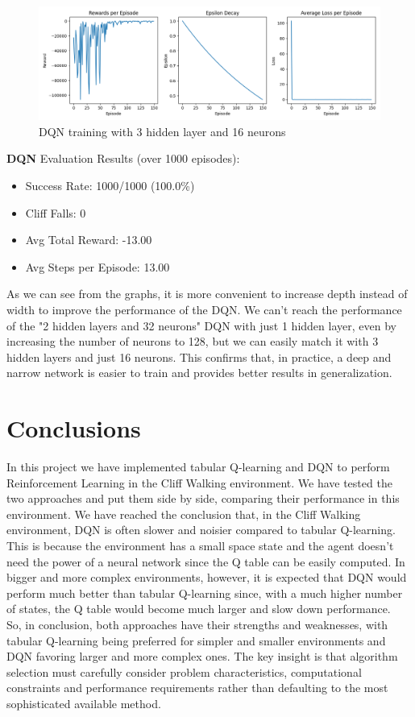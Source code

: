 \documentclass[a4paper,12pt]{article}
\begin{document}
\begin{figure}[H]
    \centering
    \includegraphics[width=\linewidth]{3_16.png}
    \caption{DQN training with 3 hidden layer and 16 neurons}
\end{figure}
\textbf{DQN} Evaluation Results (over 1000 episodes):
\begin{itemize}
    \item Success Rate: 1000/1000 (100.0\%)
    \item Cliff Falls: 0
    \item Avg Total Reward: -13.00
    \item Avg Steps per Episode: 13.00
\end{itemize}
\vspace{0,5cm}
As we can see from the graphs, it is more convenient to increase depth instead of width to improve the performance of the DQN. We can't reach the performance of the "2 hidden layers and 32 neurons" DQN with just 1 hidden layer, even by increasing the number of neurons to 128, but we can easily match it with 3 hidden layers and just 16 neurons. This confirms that, in practice, a deep and narrow network is easier to train and provides
better results in generalization.

\section{Conclusions}
In this project we have implemented tabular Q-learning and DQN to perform Reinforcement Learning in the Cliff Walking environment. We have tested the two approaches and put them side by side, comparing their performance in this environment. We have reached the conclusion that, in the Cliff Walking environment, DQN is often slower and noisier compared to tabular Q-learning. This is because the environment has a small space state and the agent doesn't need the power of a neural network since the Q table can be easily computed. In bigger and more complex environments, however, it is expected that DQN would perform much better than tabular Q-learning since, with a much higher number of states, the Q table would become much larger and slow down performance.\\

\noindent So, in conclusion, both approaches have their strengths and weaknesses, with tabular Q-learning being preferred for simpler and smaller environments and DQN favoring larger and more complex ones. The key insight is that algorithm selection must carefully consider problem characteristics, computational constraints and performance requirements rather than defaulting to the most sophisticated available method.
\end{document}
